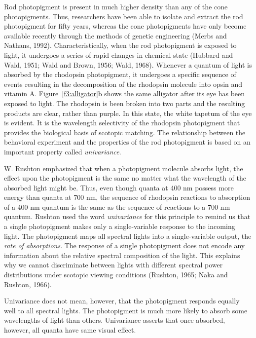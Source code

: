 Rod photopigment is present in much higher density
than any of the cone photopigments.
Thus, researchers have been able to
isolate and extract the rod photopigment
for fifty years,
whereas the cone photopigments have only become 
available recently through the methods of genetic engineering
(Merbs and Nathans, 1992).
Characteristically, when the rod photopigment
is exposed to light, it undergoes a series of
rapid changes in chemical state (Hubbard and Wald, 1951;
Wald and Brown, 1956; Wald, 1968).
Whenever a quantum of light is absorbed by the rhodopsin
photopigment, it undergoes a specific sequence of events
resulting in the decomposition of the rhodopsin
molecule into opsin and vitamin A.
Figure~\ref{f3:alligator}b
shows the same alligator after
its eye  has been exposed to light.
The rhodopsin is been broken into two parts
and the resulting products are clear, rather
than purple.
In this state, the white tapetum of the eye is evident.
It is the wavelength selectivity of the rhodopsin photopigment
that provides the biological basis of scotopic matching.
The relationship between the behavioral experiment and
the properties of the rod photopigment is based on
an important property called {\em univariance}.

W. Rushton emphasized that
when a photopigment molecule absorbs 
light, the effect upon the photopigment is the same
no matter what the wavelength
of the absorbed light might be.
Thus, even though quanta at 400 nm possess more energy
than quanta at 700 nm, the sequence of rhodopsin reactions
to absorption of a 400 nm quantum is the same as
the sequence of reactions to a 700 nm quantum.
Rushton used the word {\em univariance} for this principle
to remind us
that a single photopigment makes only a single-variable response
to the incoming light.
The photopigment maps all
spectral lights into a single-variable output, the 
{\em rate of absorptions}.
The response of a single photopigment
does not encode any information
about the relative spectral composition of the light.
This explains why we cannot discriminate between lights with
different spectral power distributions under scotopic viewing
conditions (Rushton, 1965; Naka and Rushton, 1966).

Univariance does not mean, however,
that the photopigment responds equally well to all spectral lights.
The photopigment is much more likely to
absorb some wavelengths of light than others.
Univariance asserts that once absorbed, however,
all quanta have same visual effect.

